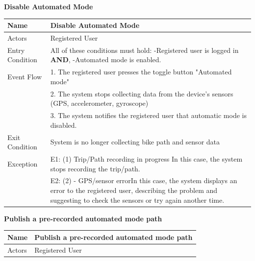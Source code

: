 \begin{enumerate}[label=\textbf{[UC\arabic*]}]
    \item \textbf{Disable Automated Mode}
        \begin{center}
            \begin{tabular}{|p{4cm}|p{11cm}|}
                \hline
                \textbf{Name} & \textbf{Disable Automated Mode} \\
                \hline
                Actors & Registered User \\
                \hline
                Entry Condition & All of these conditions must hold: \newline -Registered user is logged in \textbf{AND}, \newline -Automated mode is enabled.\\
                \hline
                Event Flow & 1. The registered user presses the toggle button "Automated mode" \\
                & 2. The system stops collecting data from the device's sensors (GPS, accelerometer, gyroscope) \\
                & 3. The system notifies the registered user that automatic mode is disabled. \\
                \hline
                Exit Condition & System is no longer collecting bike path and sensor data \\
                \hline
                Exception & E1: (1) Trip/Path recording in progress \newline 
                In this case, the system stops recording the trip/path. \\
                &  E2: (2) - GPS/sensor error\newline In this case, the system displays an error to the registered user, describing the problem and suggesting to check the sensors or try again another time. \\
                \hline
            \end{tabular}
        \end{center}
\newpage
        \item \textbf{Publish a pre-recorded automated mode path}
        \begin{center}
            \begin{tabular}{|p{4cm}|p{11cm}|}
                \hline
                \textbf{Name} & \textbf{Publish a pre-recorded automated mode path} \\
                \hline
                Actors & Registered User \\

\end{tabular}
\end{center}
\end{enumerate}
